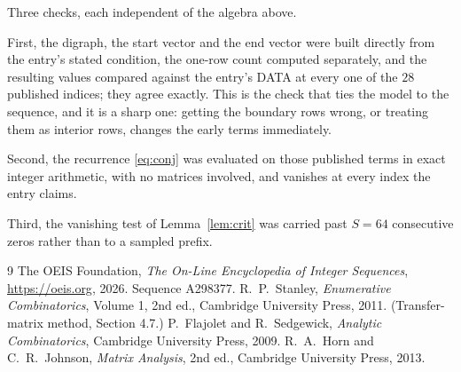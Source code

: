 \documentclass[11pt,a4paper]{article}
\theoremstyle{plain}
\theoremstyle{definition}
\begin{document}
Three checks, each independent of the algebra above.

First, the digraph, the start vector and the end vector were built directly from the
entry's stated condition, the one-row count computed separately, and the resulting values
compared against the entry's DATA at every one of the $28$ published indices; they
agree exactly. This is the check that ties the model to the sequence, and it is a sharp one:
getting the boundary rows wrong, or treating them as interior rows, changes the early terms
immediately.

Second, the recurrence \eqref{eq:conj} was evaluated on those published terms in exact
integer arithmetic, with no matrices involved, and vanishes at every index the entry claims.

Third, the vanishing test of Lemma~\ref{lem:crit} was carried past $S=64$ consecutive
zeros rather than to a sampled prefix.

\begin{thebibliography}{9}
 The OEIS Foundation, \emph{The On-Line Encyclopedia of Integer
Sequences}, \url{https://oeis.org}, 2026. Sequence A298377.
 R.~P.~Stanley, \emph{Enumerative Combinatorics}, Volume 1, 2nd ed.,
Cambridge University Press, 2011. (Transfer-matrix method, Section 4.7.)
 P.~Flajolet and R.~Sedgewick, \emph{Analytic Combinatorics}, Cambridge
University Press, 2009.
 R.~A.~Horn and C.~R.~Johnson, \emph{Matrix Analysis}, 2nd ed., Cambridge
University Press, 2013.
\end{thebibliography}
\end{document}
